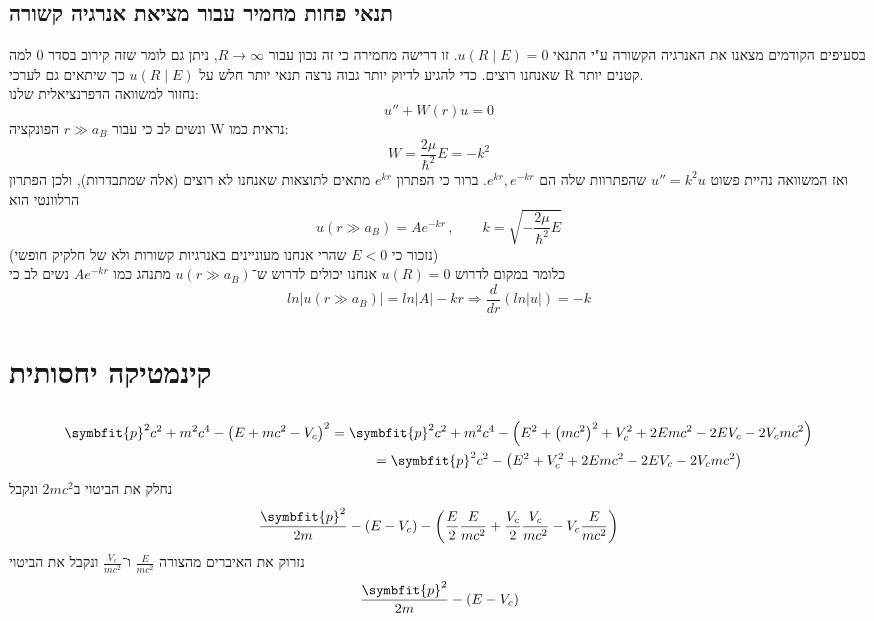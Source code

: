 \documentclass{article}
\begin{document}
\subsection{תנאי פחות מחמיר עבור מציאת אנרגיה קשורה}
בסעיפים הקודמים מצאנו את האנרגיה הקשורה ע"י התנאי $u(R\mid E) = 0$. זו דרישה מחמירה כי זה נכון עבור $R\rightarrow\infty$, ניתן גם לומר שזה קירוב בסדר 0 למה שאנחנו רוצים. כדי להגיע לדיוק יותר גבוה נרצה תנאי יותר חלש על $u(R\mid E)$ כך שיתאים גם לערכי R קטנים יותר.\\
נחזור למשוואה הדפרנציאלית שלנו:
$$u''+W(r)u=0$$
ונשים לב כי עבור $r\gg a_B$ הפונקציה W נראית כמו:
$$W=\frac{2\mu}{\hbar^2}E = -k^2$$
ואז המשוואה נהיית פשוט 
$u''=k^2u$
שהפתרוות שלה הם $e^{kr},e^{-kr}$. ברור כי הפתרון $e^{kr}$ מתאים לתוצאות שאנחנו לא רוצים (אלה שמתבדרות), ולכן הפתרון הרלוונטי הוא 
$$u(r\gg a_B) = Ae^{-kr}\,,\qquad k = \sqrt{-\frac{2\mu}{\hbar^2}E}$$
(נזכור כי $E<0$ שהרי אנחנו מעוניינים באנרגיות קשורות ולא של חלקיק חופשי)\\
כלומר במקום לדרוש $u(R)=0$ אנחנו יכולים לדרוש ש־$u(r\gg a_B)$ מתנהג כמו $Ae^{-kr}$
נשים לב כי 
$$ln|u(r\gg a_B)| = ln|A|-kr \Rightarrow \frac{d}{dr}(ln|u|) = -k$$



\section{קינמטיקה יחסותית}
\subsection{}
\begin{align*}
    \symbfit{p}^2 c^2 + m^2 c^4 - {\left(E + mc^2-V_c\right)}^2 &= \symbfit{p}^2 c^2 + m^2 c^4 - {\left(E ^2+ \left(mc^2\right)^2+V_c^2 + 2Emc^2 - 2EV_c -2V_cmc^2\right)} \\ 
    &\indent\indent= \symbfit{p}^2 c^2 - \left(E ^2 + V_c^2 + 2Emc^2 - 2EV_c -2V_cmc^2\right)
\end{align*}
נחלק את הביטוי ב$2mc^2$ ונקבל
$$\frac{\symbfit{p}^2}{2m} - \left(E - V_c\right) - \left(\frac{E}{2}\frac{E}{mc^2} + \frac{V_c}{2}\frac{V_c}{mc^2} - V_c\frac{E}{mc^2} \right)$$
נזרוק את האיברים מהצורה $\frac{E}{mc^2}$ ו־$\frac{V_c}{mc^2}$
ונקבל את הביטוי
$$ \frac{\symbfit{p}^2}{2m} - \left(E - V_c \right)$$
\end{document}
